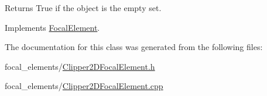\begin{DoxyReturn}{Returns}
True if the object is the empty set. 
\end{DoxyReturn}


Implements \hyperlink{classFocalElement_aed131a65fdfc885019f9bf8f1d454508}{Focal\+Element}.



The documentation for this class was generated from the following files\+:\begin{DoxyCompactItemize}
\item 
focal\+\_\+elements/\hyperlink{Clipper2DFocalElement_8h}{Clipper2\+D\+Focal\+Element.\+h}\item 
focal\+\_\+elements/\hyperlink{Clipper2DFocalElement_8cpp}{Clipper2\+D\+Focal\+Element.\+cpp}\end{DoxyCompactItemize}

